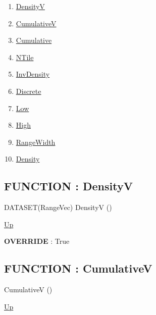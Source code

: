\par
\par
\begin{enumerate}
\item \hyperlink{ecldoc:linearregression.ols.distributionbase.densityv}{DensityV}
\item \hyperlink{ecldoc:linearregression.ols.distributionbase.cumulativev}{CumulativeV}
\item \hyperlink{ecldoc:linearregression.ols.distributionbase.cumulative}{Cumulative}
\item \hyperlink{ecldoc:linearregression.ols.distributionbase.ntile}{NTile}
\item \hyperlink{ecldoc:linearregression.ols.distributionbase.invdensity}{InvDensity}
\item \hyperlink{ecldoc:linearregression.ols.distributionbase.discrete}{Discrete}
\item \hyperlink{ecldoc:linearregression.ols.fdistribution.low}{Low}
\item \hyperlink{ecldoc:linearregression.ols.fdistribution.high}{High}
\item \hyperlink{ecldoc:linearregression.ols.fdistribution.rangewidth}{RangeWidth}
\item \hyperlink{ecldoc:linearregression.ols.fdistribution.density}{Density}
\end{enumerate}
\subsection*{FUNCTION : DensityV}
\hypertarget{ecldoc:linearregression.ols.distributionbase.densityv}{}
\begin{minipage}[t]{\textwidth}
\begin{flushleft}
DATASET(RangeVec) DensityV ()
\end{flushleft}
\end{minipage}
\hyperlink{ecldoc:linearregression.ols.fdistribution}{Up}

\par
\par
\textbf{OVERRIDE} : True \\
\subsection*{FUNCTION : CumulativeV}
\hypertarget{ecldoc:linearregression.ols.distributionbase.cumulativev}{}
\begin{minipage}[t]{\textwidth}
\begin{flushleft}
 CumulativeV ()
\end{flushleft}
\end{minipage}
\hyperlink{ecldoc:linearregression.ols.fdistribution}{Up}

